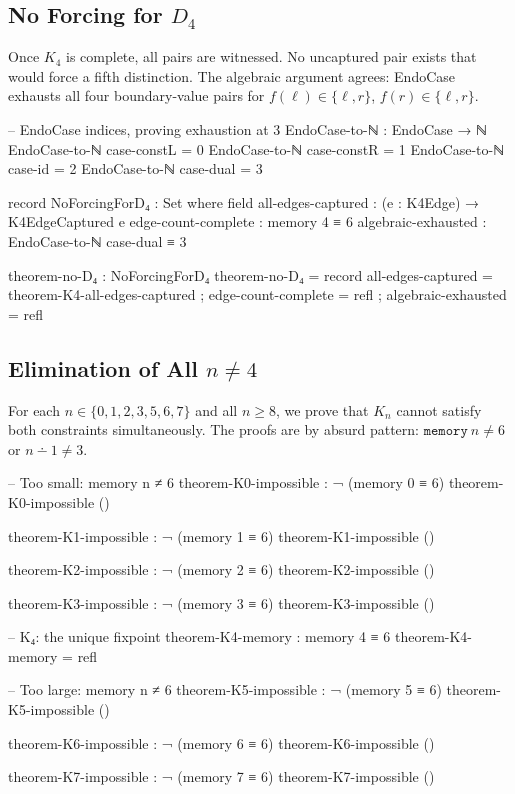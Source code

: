 \documentclass[11pt,a4paper]{article}
\begin{document}
\subsection{No Forcing for $D_4$}

Once $K_4$ is complete, all pairs are witnessed. No uncaptured pair
exists that would force a fifth distinction. The algebraic argument
agrees: EndoCase exhausts all four boundary-value pairs for $f(\ell)
\in \{\ell,r\}$, $f(r) \in \{\ell,r\}$.

\begin{code}
-- EndoCase indices, proving exhaustion at 3
EndoCase-to-ℕ : EndoCase → ℕ
EndoCase-to-ℕ case-constL = 0
EndoCase-to-ℕ case-constR = 1
EndoCase-to-ℕ case-id     = 2
EndoCase-to-ℕ case-dual   = 3

record NoForcingForD₄ : Set where
  field
    all-edges-captured  : (e : K4Edge) → K4EdgeCaptured e
    edge-count-complete : memory 4 ≡ 6
    algebraic-exhausted : EndoCase-to-ℕ case-dual ≡ 3

theorem-no-D₄ : NoForcingForD₄
theorem-no-D₄ = record
  { all-edges-captured  = theorem-K4-all-edges-captured
  ; edge-count-complete = refl
  ; algebraic-exhausted = refl
  }
\end{code}

\subsection{Elimination of All $n \neq 4$}

For each $n \in \{0, 1, 2, 3, 5, 6, 7\}$ and all $n \geq 8$,
we prove that $K_n$ cannot satisfy both constraints simultaneously.
The proofs are by absurd pattern: $\texttt{memory}~n \neq 6$ or
$n \dotminus 1 \neq 3$.

\begin{code}
-- Too small: memory n ≠ 6
theorem-K0-impossible : ¬ (memory 0 ≡ 6)
theorem-K0-impossible ()

theorem-K1-impossible : ¬ (memory 1 ≡ 6)
theorem-K1-impossible ()

theorem-K2-impossible : ¬ (memory 2 ≡ 6)
theorem-K2-impossible ()

theorem-K3-impossible : ¬ (memory 3 ≡ 6)
theorem-K3-impossible ()

-- K₄: the unique fixpoint
theorem-K4-memory : memory 4 ≡ 6
theorem-K4-memory = refl

-- Too large: memory n ≠ 6
theorem-K5-impossible : ¬ (memory 5 ≡ 6)
theorem-K5-impossible ()

theorem-K6-impossible : ¬ (memory 6 ≡ 6)
theorem-K6-impossible ()

theorem-K7-impossible : ¬ (memory 7 ≡ 6)
theorem-K7-impossible ()
\end{code}
\end{document}

